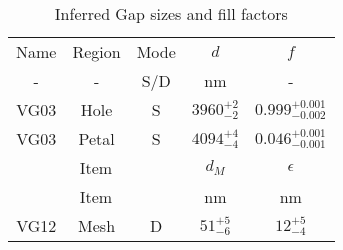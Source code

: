 \begin{table}[h!]
\caption{Inferred Gap sizes and fill factors \label{tbl_DerivedGapSizes}}
\begin{center}
    \begin{tabular}{ c c c c c }
    \hline
    Name & Region & Mode & $d$  &  $f$ \\ 
    -  & - & S/D & nm & - \\
    \hline

    VG03 & Hole    &   S  & $3960^{+2}_{-2}$ &  $0.999^{+0.001}_{-0.002}$\\
    VG03 & Petal   &   S  & $4094^{+4}_{-4}$ &  $0.046^{+0.001}_{-0.001}$\\
    \hline
    \multicolumn{3}{c}{Item} & $d_M$ & $\epsilon$ \\
    \multicolumn{3}{c}{Item} & nm    & nm \\
    \hline
    VG12 & Mesh    &   D & $51^{+5}_{-6}  $ &  $12^{+5}_{-4}$\\
    \hline
    \end{tabular}
\end{center}
\end{table}
